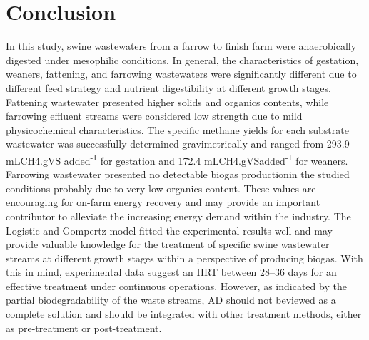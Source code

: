 \section{Conclusion}
In this study, swine wastewaters from a farrow to finish farm were anaerobically digested under mesophilic conditions. In general, the characteristics of gestation, weaners, fattening, and farrowing wastewaters were significantly different due to different feed strategy and nutrient digestibility at different growth stages. Fattening wastewater presented higher solids and organics contents, while farrowing effluent streams were considered low strength due to mild physicochemical characteristics. The specific methane yields for each substrate wastewater was successfully determined gravimetrically and ranged from 293.9 mLCH4.gVS added\textsuperscript{-1} for gestation and 172.4 mLCH4.gVSadded\textsuperscript{-1} for weaners. Farrowing wastewater presented no detectable biogas productionin the studied conditions probably due to very low organics content. These values are encouraging for on-farm energy recovery and may provide an important contributor to
alleviate the increasing energy demand within the industry. The Logistic and Gompertz model fitted the experimental results well and may provide valuable knowledge for the treatment of specific swine wastewater streams at different growth stages within a perspective of producing biogas. With this in mind, experimental data suggest an HRT between 28–36 days for an effective treatment under continuous operations. However, as indicated by the partial biodegradability of the waste streams, AD should not beviewed as a complete solution and should be integrated with other treatment methods,
either as pre-treatment or post-treatment.